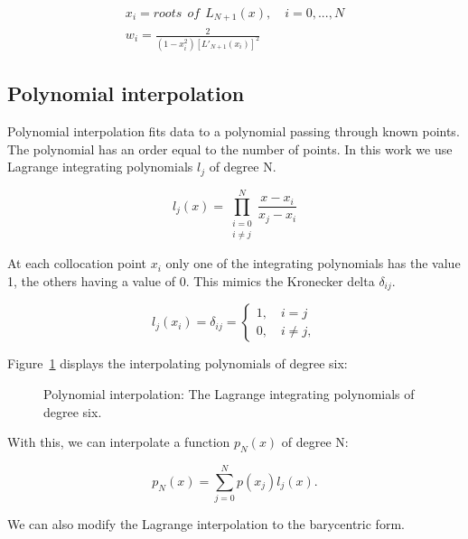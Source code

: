 \begin{gather}
	x_i = roots \:\: of \:\: L_{N + 1}(x), \quad i = 0, ..., N \\
	w_i = \frac{2}{(1-x_i^2)\left [ L'_{N + 1}(x_i) \right ]^2}
\end{gather}

\subsection{Polynomial interpolation} \label{subsection:spectral_element_method:spectral_approximation:polynomial_interpolation}

Polynomial interpolation fits data to a polynomial passing through known points. The polynomial has
an order equal to the number of points. In this work we use Lagrange integrating polynomials $l_j$
of degree N.

\begin{equation}
	l_j(x) = \prod_{\substack{i = 0 \\ i \neq j}}^{N}\frac{x- x_i}{x_j - x_i}
\end{equation}

At each collocation point $x_i$ only one of the integrating polynomials has the value 1, the others
having a value of 0. This mimics the Kronecker delta $\delta_{i j}$.

\begin{equation}
	l_j(x_i) = \delta_{i j} = \left\{\begin{matrix}
	1, \quad i = j\\ 
	0, \quad i \neq j,
	\end{matrix}\right.
\end{equation}

Figure~\ref{fig:interpolants} displays the interpolating polynomials of degree six:

\begin{figure}[H]
	\centering
	
	\caption{Polynomial interpolation: The Lagrange integrating polynomials of degree six.}
	\label{fig:interpolants}
\end{figure}

With this, we can interpolate a function $p_N \left( x \right)$ of degree N:

\begin{equation}
	p_N(x) = \sum_{j = 0}^{N}p(x_j)l_j(x).
\end{equation}

We can also modify the Lagrange interpolation to the barycentric form.


